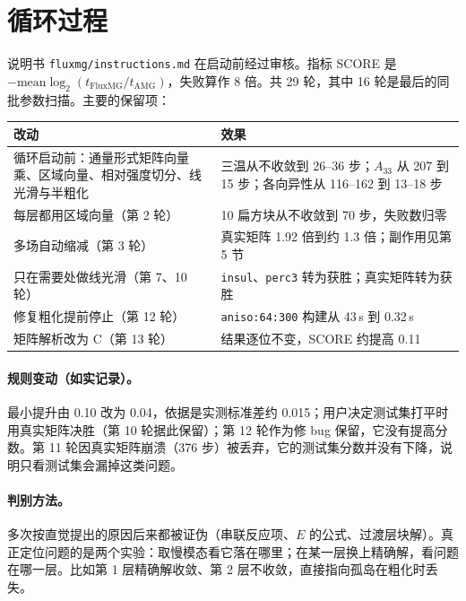 \documentclass[11pt,a4paper]{ctexart}
\begin{document}
\section{循环过程}
说明书 \texttt{fluxmg/instructions.md} 在启动前经过审核。指标 SCORE 是 $-\text{mean}\log_2(t_\text{FluxMG}/t_\text{AMG})$，失败算作 8 倍。共 29 轮，其中 16 轮是最后的同批参数扫描。主要的保留项：

\begin{table}[H]
\centering\footnotesize
\begin{tabular}{p{7.2cm}p{7.6cm}}
\toprule
改动 & 效果 \\
\midrule
循环启动前：通量形式矩阵向量乘、区域向量、相对强度切分、线光滑与半粗化 & 三温从不收敛到 26--36 步；$A_{33}$ 从 207 到 15 步；各向异性从 116--162 到 13--18 步 \\
每层都用区域向量（第 2 轮） & 10 扁方块从不收敛到 70 步，失败数归零 \\
多场自动缩减（第 3 轮） & 真实矩阵 1.92 倍到约 1.3 倍；副作用见第 5 节 \\
只在需要处做线光滑（第 7、10 轮） & \texttt{insul}、\texttt{perc3} 转为获胜；真实矩阵转为获胜 \\
修复粗化提前停止（第 12 轮） & \texttt{aniso:64:300} 构建从 43\,s 到 0.32\,s \\
矩阵解析改为 C（第 13 轮） & 结果逐位不变，SCORE 约提高 0.11 \\
\bottomrule
\end{tabular}
\end{table}

\paragraph{规则变动（如实记录）。}最小提升由 0.10 改为 0.04，依据是实测标准差约 0.015；用户决定测试集打平时用真实矩阵决胜（第 10 轮据此保留）；第 12 轮作为修 bug 保留，它没有提高分数。第 11 轮因真实矩阵崩溃（376 步）被丢弃，它的测试集分数并没有下降，说明只看测试集会漏掉这类问题。

\paragraph{判别方法。}多次按直觉提出的原因后来都被证伪（串联反应项、$E$ 的公式、过渡层块解）。真正定位问题的是两个实验：取慢模态看它落在哪里；在某一层换上精确解，看问题在哪一层。比如第 1 层精确解收敛、第 2 层不收敛，直接指向孤岛在粗化时丢失。
\end{document}
